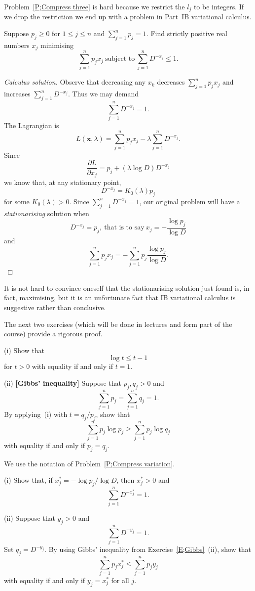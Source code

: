 Problem~\ref{P;Compress three} is hard because
we restrict the $l_{j}$ to be integers.
If we drop the restriction we end up with a problem
in Part~IB variational calculus.
\begin{problem}\label{P;Compress variation}
Suppose $p_{j}\geq 0$ for $1\leq j\leq n$ and $\sum_{j=1}^{n}p_{j}=1$.
Find strictly positive real numbers $x_{j}$ minimising
\[\sum_{j=1}^{n}p_{j}x_{j}\ \text{subject to} 
\ \sum_{j=1}^{n}D^{-x_{j}}\leq 1.\]
\end{problem}
\begin{proof}[Calculus solution] Observe 
that decreasing any $x_{k}$
decreases $\sum_{j=1}^{n}p_{j}x_{j}$
and increases $\sum_{j=1}^{n}D^{-x_{j}}$. Thus we may demand
\[\sum_{j=1}^{n}D^{-x_{j}}=1.\]
The Lagrangian is
\[L({\mathbf x},\lambda)=\sum_{j=1}^{n}p_{j}x_{j}
-\lambda\sum_{j=1}^{n}D^{-x_{j}}.\]
Since
\[\frac{\partial L}{\partial x_{j}}
=p_{j}+(\lambda\log D)D^{-x_{j}}\]
we know that, at any stationary point,
\[D^{-x_{j}}=K_{0}(\lambda)p_{j}\]
for some $K_{0}(\lambda)>0$. Since $\sum_{j=1}^{n}D^{-x_{j}}=1$,
our original problem will have a \emph{stationarising}
solution when
\[D^{-x_{j}}=p_{j},\ \text{that is to say}
\ x_{j}=-\frac{\log p_{j}}{\log D}\]
and
\[\sum_{j=1}^{n}p_{j}x_{j}=
-\sum_{j=1}^{n}p_{j}\frac{\log p_{j}}{\log D}.\]
\end{proof}
It is not hard to convince oneself that the  stationarising
solution just found is, in fact, maximising, but it is an
unfortunate fact that IB variational calculus is suggestive
rather than conclusive. 

The next two exercises 
(which will be done in lectures and form part of the course) 
provide a rigorous proof.
\begin{exercise}\label{E;Gibbs} (i) Show that
\[\log t\leq t-1\]
for $t>0$ with equality if and only if $t=1$.

(ii) {\bf [Gibbs' inequality]}
Suppose that $p_{j},q_{j}>0$ and 
\[\sum_{j=1}^{n}p_{j}=\sum_{j=1}^{n}q_{j}=1.\] 
By applying~(i) with $t=q_{j}/p_{j}$, show that
\[\sum_{j=1}^{n}p_{j}\log p_{j}\geq \sum_{j=1}^{n}p_{j}\log q_{j}\]
with equality if and only if $p_{j}=q_{j}$. 
\end{exercise}
\begin{exercise} We use the notation of 
Problem~\ref{P;Compress variation}.

(i) Show that, if $x_{j}^{*}=-\log p_{j}/\log D$, then
$x_{j}^{*}>0$ and
\[\sum_{j=1}^{n}D^{-x_{j}^{*}}=1.\]

(ii) Suppose that $y_{j}>0$ and
\[\sum_{j=1}^{n}D^{-y_{j}}=1.\]
Set $q_{j}=D^{-y_{j}}$. By using Gibbs' inequality
from Exercise~\ref{E;Gibbs}~(ii), show that
\[\sum_{j=1}^{n}p_{j}x_{j}^{*}\leq \sum_{j=1}^{n}p_{j}y_{j}\]
with equality if and only if $y_{j}=x_{j}^{*}$ for all $j$.
\end{exercise}

